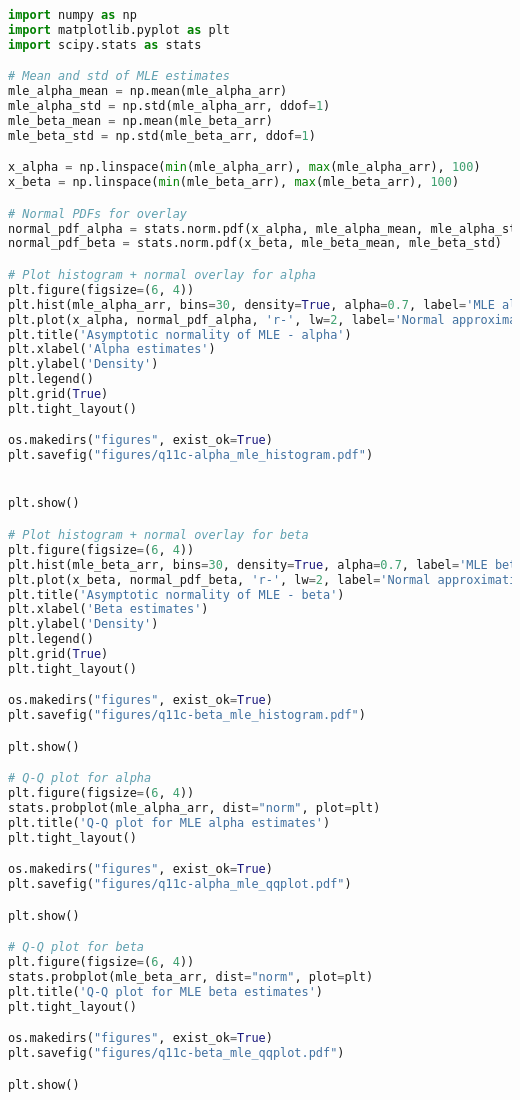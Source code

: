 \begin{lstlisting}[language=Python]
import numpy as np
import matplotlib.pyplot as plt
import scipy.stats as stats

# Mean and std of MLE estimates
mle_alpha_mean = np.mean(mle_alpha_arr)
mle_alpha_std = np.std(mle_alpha_arr, ddof=1)
mle_beta_mean = np.mean(mle_beta_arr)
mle_beta_std = np.std(mle_beta_arr, ddof=1)

x_alpha = np.linspace(min(mle_alpha_arr), max(mle_alpha_arr), 100)
x_beta = np.linspace(min(mle_beta_arr), max(mle_beta_arr), 100)

# Normal PDFs for overlay
normal_pdf_alpha = stats.norm.pdf(x_alpha, mle_alpha_mean, mle_alpha_std)
normal_pdf_beta = stats.norm.pdf(x_beta, mle_beta_mean, mle_beta_std)

# Plot histogram + normal overlay for alpha
plt.figure(figsize=(6, 4))
plt.hist(mle_alpha_arr, bins=30, density=True, alpha=0.7, label='MLE alpha')
plt.plot(x_alpha, normal_pdf_alpha, 'r-', lw=2, label='Normal approximation')
plt.title('Asymptotic normality of MLE - alpha')
plt.xlabel('Alpha estimates')
plt.ylabel('Density')
plt.legend()
plt.grid(True)
plt.tight_layout()

os.makedirs("figures", exist_ok=True)
plt.savefig("figures/q11c-alpha_mle_histogram.pdf")


plt.show()

# Plot histogram + normal overlay for beta
plt.figure(figsize=(6, 4))
plt.hist(mle_beta_arr, bins=30, density=True, alpha=0.7, label='MLE beta')
plt.plot(x_beta, normal_pdf_beta, 'r-', lw=2, label='Normal approximation')
plt.title('Asymptotic normality of MLE - beta')
plt.xlabel('Beta estimates')
plt.ylabel('Density')
plt.legend()
plt.grid(True)
plt.tight_layout()

os.makedirs("figures", exist_ok=True)
plt.savefig("figures/q11c-beta_mle_histogram.pdf")

plt.show()

# Q-Q plot for alpha
plt.figure(figsize=(6, 4))
stats.probplot(mle_alpha_arr, dist="norm", plot=plt)
plt.title('Q-Q plot for MLE alpha estimates')
plt.tight_layout()

os.makedirs("figures", exist_ok=True)
plt.savefig("figures/q11c-alpha_mle_qqplot.pdf")

plt.show()

# Q-Q plot for beta
plt.figure(figsize=(6, 4))
stats.probplot(mle_beta_arr, dist="norm", plot=plt)
plt.title('Q-Q plot for MLE beta estimates')
plt.tight_layout()

os.makedirs("figures", exist_ok=True)
plt.savefig("figures/q11c-beta_mle_qqplot.pdf")

plt.show()
\end{lstlisting}


